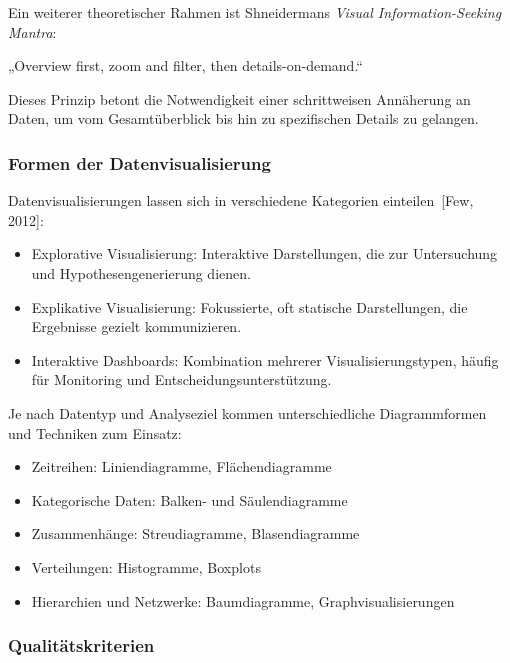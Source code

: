 Ein weiterer theoretischer Rahmen ist Shneidermans \textit{Visual Information-Seeking Mantra}:



„Overview first, zoom and filter, then details-on-demand.“

Dieses Prinzip betont die Notwendigkeit einer schrittweisen Annäherung an Daten, um vom Gesamtüberblick bis hin zu spezifischen Details zu gelangen.


\subsubsection{Formen der Datenvisualisierung}

Datenvisualisierungen lassen sich in verschiedene Kategorien einteilen [Few, 2012]:

\begin{itemize}

\item
Explorative Visualisierung: Interaktive Darstellungen, die zur Untersuchung und Hypothesengenerierung dienen.
\item
Explikative Visualisierung: Fokussierte, oft statische Darstellungen, die Ergebnisse gezielt kommunizieren.
\item
Interaktive Dashboards: Kombination mehrerer Visualisierungstypen, häufig für Monitoring und Entscheidungsunterstützung.

\end{itemize}

Je nach Datentyp und Analyseziel kommen unterschiedliche Diagrammformen und Techniken zum Einsatz:

\begin{itemize}

\item
Zeitreihen: Liniendiagramme, Flächendiagramme
\item
Kategorische Daten: Balken- und Säulendiagramme
\item
Zusammenhänge: Streudiagramme, Blasendiagramme
\item
Verteilungen: Histogramme, Boxplots
\item
Hierarchien und Netzwerke: Baumdiagramme, Graphvisualisierungen

\end{itemize}

\subsubsection{Qualitätskriterien}

